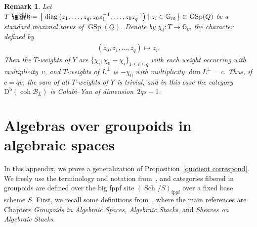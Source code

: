 \documentclass[pdftex]{sigma}%
\makeatletter
\newtheorem{rem}[dfn]{Remark}
\newcommand*{\defeq}{\mathrel{\rlap{%
 \raisebox{0.3ex}{$\m@th\cdot$}}%
 \raisebox{-0.3ex}{$\m@th\cdot$}}%
 =}
\numberwithin{equation}{section}
\newcommand{\coh}{\operatorname{coh}}
\newcommand{\Db}{\operatorname{D^b}}
\newcommand{\diag}{\operatorname{diag}}
\newcommand{\GSp}{\operatorname{GSp}}
\newcommand{\Sch}{\operatorname{Sch\!}}
\newcommand{\fppf}{\operatorname{fppf}}
\newcommand{\cB}{\mathcal{B}}
\newcommand{\bG}{\mathbb{G}}
\makeatother
\begin{document}
\begin{rem}
Let $T\defeq\big\{\diag\big(z_1,\hdots,z_q,z_0z_1^{-1},\hdots,z_0z_q^{-1}\big)\mid z_i\in \bG_m\big\}\subset \GSp(Q)$ be a standard maximal torus of $\GSp(Q)$. Denote by $\chi_i\colon T\to \bG_m$ the character defined by
\begin{gather*}
(z_0,z_1,\hdots,z_q)\mapsto z_i.
\end{gather*}
Then the $T$-weights of $Y$ are $\{\chi_i,\chi_0-\chi_i\}_{1\leq i\leq q}$ with each weight occurring with multiplicity~$v$, and $T$-weights of $L^{\perp}$ is $-\chi_0$ with multiplicity $\dim L^{\perp}=c$. Thus, if $c=qv$, the sum of all $T$-weights of $Y$ is trivial, and in this case the category $\Db(\coh \cB_L)$ is Calabi--Yau of dimen\-sion~$2qs-1$.
\end{rem}
\appendix

\section{Algebras over groupoids in algebraic spaces}\label{appendix}

In this appendix, we prove a generalization of Proposition~\ref{quotient correspond}. We freely use the terminology and notation from~\cite{stacks}, and categories fibered in groupoids are defined over the big fppf site $(\Sch/S)_{\fppf}$ over a fixed base scheme $S$. First, we recall some definitions from~\cite{stacks}, where the main references are Chapters {\it Groupoids in Algebraic Spaces, Algebraic Stacks}, and {\it Sheaves on Algebraic Stacks}.
\end{document}
